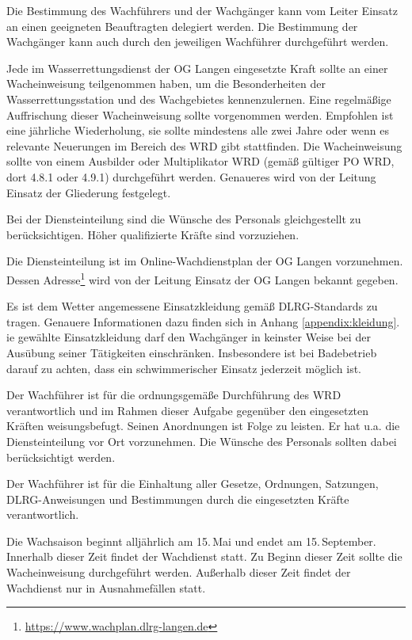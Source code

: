 Die Bestimmung des Wachführers und der Wachgänger kann vom Leiter Einsatz an einen geeigneten Beauftragten delegiert werden. Die Bestimmung der Wachgänger kann auch durch den jeweiligen Wachführer durchgeführt werden.

Jede im Wasserrettungsdienst der OG Langen eingesetzte Kraft sollte an einer Wacheinweisung teilgenommen haben, um die Besonderheiten der Wasserrettungsstation und des Wachgebietes kennenzulernen. 
Eine regelmäßige Auffrischung dieser Wacheinweisung sollte vorgenommen werden. 
Empfohlen ist eine jährliche Wiederholung, sie sollte mindestens alle zwei Jahre oder wenn es relevante Neuerungen im Bereich des WRD gibt stattfinden. 
Die Wacheinweisung sollte von einem Ausbilder oder Multiplikator WRD (gemäß gültiger PO WRD, dort 4.8.1 oder 4.9.1) durchgeführt werden. 
Genaueres wird von der Leitung Einsatz der Gliederung festgelegt.

Bei der Diensteinteilung sind die Wünsche des Personals gleichgestellt zu berücksichtigen. Höher qualifizierte Kräfte sind vorzuziehen.

Die Diensteinteilung ist im Online-Wachdienstplan der OG Langen vorzunehmen. Dessen Adresse\footnote{\url{https://www.wachplan.dlrg-langen.de}} wird von der Leitung Einsatz der OG Langen bekannt gegeben.

Es ist dem Wetter angemessene Einsatzkleidung gemäß DLRG-Standards zu tragen. Genauere Informationen dazu finden sich in Anhang \vref{appendix:kleidung}.
ie gewählte Einsatzkleidung darf den Wachgänger in keinster Weise bei der Ausübung seiner Tätigkeiten einschränken. Insbesondere ist bei Badebetrieb darauf zu achten, dass ein schwimmerischer Einsatz jederzeit möglich ist.

Der Wachführer ist für die ordnungsgemäße Durchführung des WRD verantwortlich und im Rahmen dieser Aufgabe gegenüber den eingesetzten Kräften weisungsbefugt. Seinen Anordnungen ist Folge zu leisten. Er hat u.a. die Diensteinteilung vor Ort vorzunehmen. Die Wünsche des Personals sollten dabei berücksichtigt werden.

Der Wachführer ist für die Einhaltung aller Gesetze, Ordnungen, Satzungen, DLRG-Anweisungen und Bestimmungen durch die eingesetzten Kräfte verantwortlich.
 
Die Wachsaison beginnt alljährlich am 15.\,Mai und endet am 15.\,September. Innerhalb dieser Zeit findet der Wachdienst statt. Zu Beginn dieser Zeit sollte die Wacheinweisung durchgeführt werden. Außerhalb dieser Zeit findet der Wachdienst nur in Ausnahmefällen statt.

